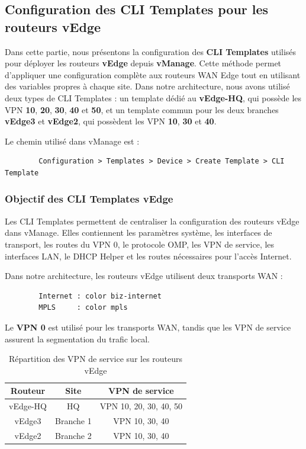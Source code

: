 \documentclass[12pt,a4paper,oneside]{report}
\begin{document}
	\subsection{Configuration des CLI Templates pour les routeurs vEdge}
	
	Dans cette partie, nous présentons la configuration des \textbf{CLI Templates} utilisés pour déployer les routeurs \textbf{vEdge} depuis \textbf{vManage}. 
	Cette méthode permet d'appliquer une configuration complète aux routeurs WAN Edge tout en utilisant des variables propres à chaque site. 
	Dans notre architecture, nous avons utilisé deux types de CLI Templates : un template dédié au \textbf{vEdge-HQ}, qui possède les VPN \textbf{10}, \textbf{20}, \textbf{30}, \textbf{40} et \textbf{50}, et un template commun pour les deux branches \textbf{vEdge3} et \textbf{vEdge2}, qui possèdent les VPN \textbf{10}, \textbf{30} et \textbf{40}.
	
	Le chemin utilisé dans vManage est :
	
	\begin{lstlisting}
		Configuration > Templates > Device > Create Template > CLI Template
	\end{lstlisting}
	
	\subsubsection{Objectif des CLI Templates vEdge}
	
	Les CLI Templates permettent de centraliser la configuration des routeurs vEdge dans vManage. 
	Elles contiennent les paramètres système, les interfaces de transport, les routes du VPN 0, le protocole OMP, les VPN de service, les interfaces LAN, le DHCP Helper et les routes nécessaires pour l'accès Internet.
	
	Dans notre architecture, les routeurs vEdge utilisent deux transports WAN :
	
	\begin{lstlisting}
		Internet : color biz-internet
		MPLS     : color mpls
	\end{lstlisting}
	
	Le \textbf{VPN 0} est utilisé pour les transports WAN, tandis que les VPN de service assurent la segmentation du trafic local.
	
	\begin{table}[H]
		\centering
		\renewcommand{\arraystretch}{1.2}
		\begin{tabular}{|c|c|c|}
			\hline
			\textbf{Routeur} & \textbf{Site} & \textbf{VPN de service} \\
			\hline
			vEdge-HQ & HQ & VPN 10, 20, 30, 40, 50 \\
			\hline
			vEdge3 & Branche 1 & VPN 10, 30, 40 \\
			\hline
			vEdge2 & Branche 2 & VPN 10, 30, 40 \\
			\hline
		\end{tabular}
		\caption{Répartition des VPN de service sur les routeurs vEdge}
		\label{tab:repartition-vpn-service-vedge}
	\end{table}
	
\end{document}
